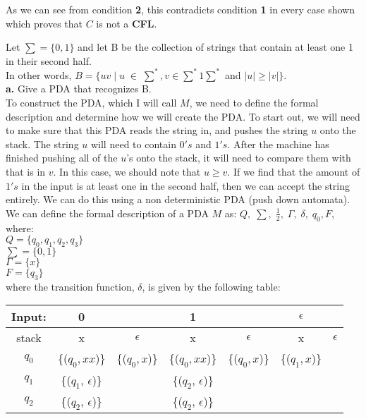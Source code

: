 \documentclass[12pt]{article}
\begin{document}
As we can see from condition \textbf{2}, this contradicts condition \textbf{1} 
in every case shown which proves that $C$ is not a \textbf{CFL}.

 Let $\sum = \{0, 1\}$ and let B be the collection of strings that contain at least one 1 in
their second half. \\
In other words, $B = \{uv \; | \; u \; \in \; \sum^*, v \in \sum^*1\sum^*$ and $|u| \geq |v|\} $. \\

\textbf{a.} Give a PDA that recognizes B. \\

To construct the PDA, which I will call $M$, we need to define the formal
description and determine how we will create the PDA. To start out,
we will need to make sure that this PDA reads the string in, and pushes
the string $u$ onto the stack. The string $u$ will need to contain $0's$
and $1's$. After the machine has finished pushing all of the $u$'s onto
the stack, it will need to compare them with that is in $v$. In this case,
we should note that $u \geq v$. If we find that the amount of $1's$ in
the input is at least one in the second half, then we can accept the string
entirely. We can do this using a non deterministic PDA (push down automata). \\

We can define the formal description of a PDA $M$ as: 
$Q, \; \sum, \; \frac{1}{2}, \; \Gamma, \; \delta, \; q_0, F $, where: \\

$Q = \{q_0, q_1, q_2, q_3\}$ \\
$\sum = \{0, 1 \}$ \\
$\Gamma = \{ x \}$ \\
$F = \{ q_3 \}$ \\

where the transition function, $\delta$,  is given by the following table: \\

\begin{tabularx}{\textwidth}{ c | c c | c c | c c }
Input: & 0 & & 1 & & $\epsilon$ \\
\hline
stack & x & $\epsilon$ & x & $\epsilon$ & x & $\epsilon$ \\
\hline
$q_0$ & \{($q_0, xx$)\} & \{($q_0, x$)\} & \{($q_0, xx$)\} & \{($q_0, x$)\} 
& \{($q_1, x$)\} \\
\hline
$q_1$ & \{($q_1$, $\epsilon$)\} & & \{($q_2$, $\epsilon$)\} \\
\hline
$q_2$ & \{($q_2$, $\epsilon$)\} & & \{($q_2$, $\epsilon$)\} \\ 
\end{tabularx} \\
\end{document}
